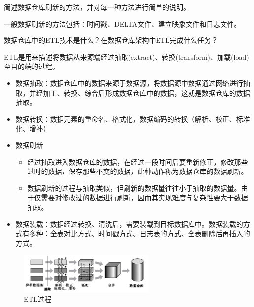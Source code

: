 \begin{problem}
简述数据仓库刷新的方法，并对每一种方法进行简单的说明。
\end{problem}

\begin{solution}
一般数据刷新的方法包括：时间戳、DELTA文件、建立映象文件和日志文件。


\end{solution}


\begin{problem}
数据仓库中的ETL技术是什么？在数据仓库架构中ETL完成什么任务？
\end{problem}

\begin{solution}
ETL是用来描述将数据从来源端经过抽取(extract)、转换(transform)、加载(load)至目的端的过程。
\begin{itemize}
    \item 数据抽取：数据仓库中的数据来源于数据源，将数据源中数据通过网络进行抽取，并经加工、转换、综合后形成数据仓库中的数据，这就是数据仓库的数据抽取。
    \item 数据转换：数据元素的重命名、格式化，数据编码的转换（解析、校正、标准化、增补）
    \item 数据刷新
    \begin{itemize}
        \item 经过抽取进入数据仓库的数据，在经过一段时间后要重新修正，修改那些过时的数据，保存那些不变的数据，此种动作称为数据仓库的数据刷新。
        \item 数据刷新的过程与抽取类似，但刷新的数据量往往小于抽取的数据量。由于仅需要对修改过的数据进行刷新，因而其实现难度与复杂性要大于数据抽取。
    \end{itemize}
    \item 数据装载：数据经过转换、清洗后，需要装载到目标数据库中。数据装载的方式有多种：全表对比方式、时间戳方式、日志表的方式、全表删除后再插入的方式。
\end{itemize}

\begin{figure}[H]
    \centering
    \vspace{-0.2em}
    \includegraphics[width=0.6\textwidth]{images/ETL过程.png}
    \caption*{ETL过程}
    \vspace{-1.3em}
\end{figure}
\end{solution}


